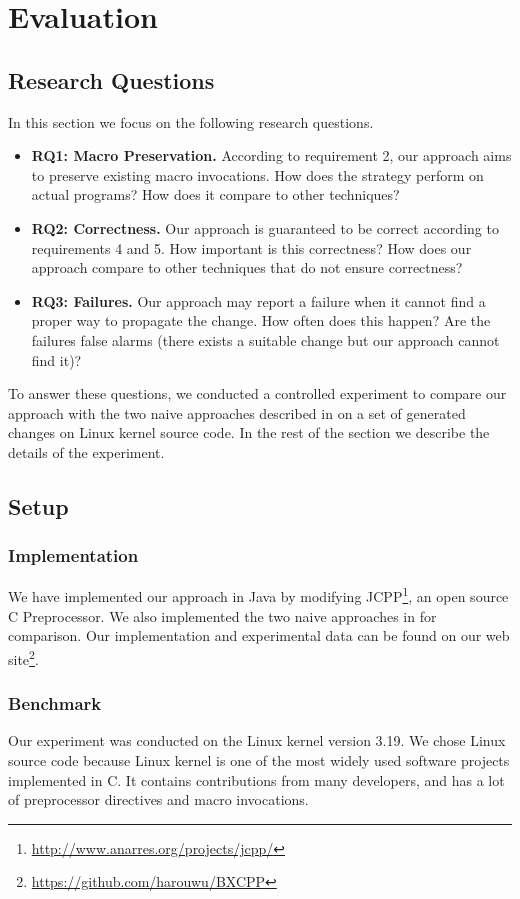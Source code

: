 
\section{Evaluation}
\label{sec:evaluation}
\subsection{Research Questions}
In this section we focus on the following research questions.
\begin{itemize}
\item {\bf RQ1: Macro Preservation. } According to requirement 2, 
  our approach aims to preserve existing macro invocations. How does
  the strategy perform on actual programs? How does it compare to
  other techniques?
\item {\bf RQ2: Correctness. } Our approach is guaranteed to be
  correct according to requirements 4 and 5. How important is this
  correctness? How does our approach compare to other techniques that
  do not ensure correctness?
\item {\bf RQ3: Failures. }  Our approach may report a failure when it
  cannot find a proper way to propagate the change. How often does
  this happen? Are the failures false alarms (there exists a suitable
  change but our approach cannot find it)?
\end{itemize}

To answer these questions, we conducted a controlled experiment to
compare our approach with the two naive approaches described in
 on a set of generated changes on Linux kernel
source code. In the rest of the section we describe the details of the
experiment.

\subsection{Setup}

\subsubsection{Implementation}
We have implemented our approach in Java by modifying
JCPP\footnote{\url{http://www.anarres.org/projects/jcpp/}}, an open
source C Preprocessor. We also implemented the two naive approaches in
 for comparison. Our implementation and experimental data
can be found on our web
site\footnote{\url{https://github.com/harouwu/BXCPP}}.

\subsubsection{Benchmark}
Our experiment was conducted on the Linux kernel version 3.19. We chose
Linux source code because Linux kernel is one of the most widely used
software projects implemented in C. It contains contributions from many
developers, and has a lot of preprocessor directives and macro
invocations.

